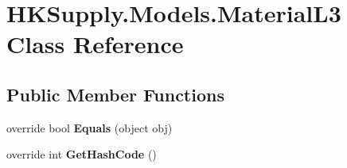 \hypertarget{class_h_k_supply_1_1_models_1_1_material_l3}{}\section{H\+K\+Supply.\+Models.\+Material\+L3 Class Reference}
\label{class_h_k_supply_1_1_models_1_1_material_l3}
\subsection*{Public Member Functions}
\begin{DoxyCompactItemize}
\item 
\mbox{\label{class_h_k_supply_1_1_models_1_1_material_l3_a000aefb62f2b266d2feb57edbaeb2ca1}} 
override bool {\bfseries Equals} (object obj)
\item 
\mbox{\label{class_h_k_supply_1_1_models_1_1_material_l3_af9f904272d6e369de0121d1014304100}} 
override int {\bfseries Get\+Hash\+Code} ()
\end{DoxyCompactItemize}

